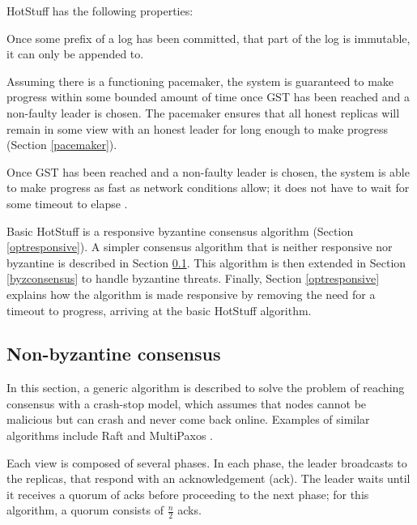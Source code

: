 HotStuff has the following properties:

\begin{property}[Safety] \label{safetyproperty}
	Once some prefix of a log has been committed, that part of the log is immutable, it can only be appended to.
\end{property}

\begin{property}[Liveness] \label{livenessproperty}
	Assuming there is a functioning pacemaker, the system is guaranteed to make progress within some bounded amount of time once GST has been reached and a non-faulty leader is chosen. The pacemaker ensures that all honest replicas will remain in some view with an honest leader for long enough to make progress (Section \ref{pacemaker}).
\end{property}

\begin{property} \label{optresponsiveproperty}
	Once GST has been reached and a non-faulty leader is chosen, the system is able to make progress as fast as network conditions allow; it does not have to wait for some timeout to elapse \cite{passThunderellaBlockchainsOptimistic2018}.
\end{property}

Basic HotStuff is a responsive byzantine consensus algorithm (Section \ref{optresponsive}). A simpler consensus algorithm that is neither responsive nor byzantine is described in Section \ref{nonbyzconsensus}. This algorithm is then extended in Section \ref{byzconsensus} to handle byzantine threats. Finally, Section \ref{optresponsive} explains how the algorithm is made responsive by removing the need for a timeout to progress, arriving at the basic HotStuff algorithm.

\subsection{Non-byzantine consensus} \label{nonbyzconsensus}
In this section, a generic algorithm is described to solve the problem of reaching consensus with a crash-stop model, which assumes that nodes cannot be malicious but can crash and never come back online. Examples of similar algorithms include Raft \cite{ongaroSearchUnderstandableConsensus2014} and MultiPaxos \cite{lamportParttimeParliament1998, lamportPaxosMadeSimple2001}.

Each view is composed of several phases. In each phase, the leader broadcasts to the replicas, that respond with an acknowledgement (ack). The leader waits until it receives a quorum of acks before proceeding to the next phase; for this algorithm, a quorum consists of $\frac{n}{2}$ acks.

